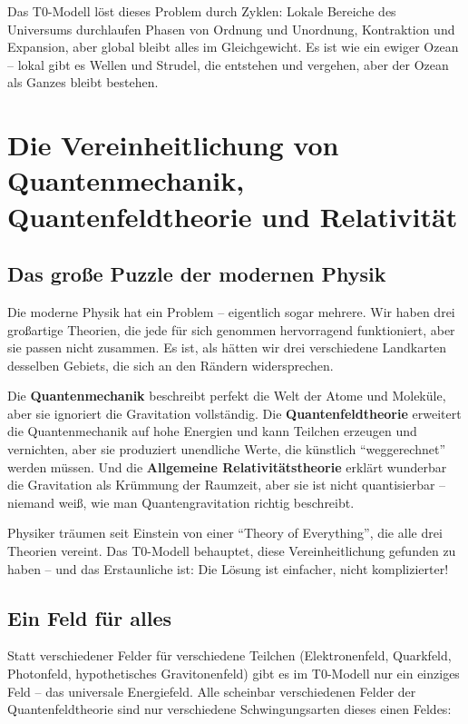 \documentclass[12pt,a4paper]{article}
\begin{document}
	Das T0-Modell löst dieses Problem durch Zyklen: Lokale Bereiche des Universums durchlaufen Phasen von Ordnung und Unordnung, Kontraktion und Expansion, aber global bleibt alles im Gleichgewicht. Es ist wie ein ewiger Ozean -- lokal gibt es Wellen und Strudel, die entstehen und vergehen, aber der Ozean als Ganzes bleibt bestehen.
	
	\section{Die Vereinheitlichung von Quantenmechanik, Quantenfeldtheorie und Relativität}
	
	\subsection{Das große Puzzle der modernen Physik}
	
	Die moderne Physik hat ein Problem -- eigentlich sogar mehrere. Wir haben drei großartige Theorien, die jede für sich genommen hervorragend funktioniert, aber sie passen nicht zusammen. Es ist, als hätten wir drei verschiedene Landkarten desselben Gebiets, die sich an den Rändern widersprechen.
	
	Die \textbf{Quantenmechanik} beschreibt perfekt die Welt der Atome und Moleküle, aber sie ignoriert die Gravitation vollständig. Die \textbf{Quantenfeldtheorie} erweitert die Quantenmechanik auf hohe Energien und kann Teilchen erzeugen und vernichten, aber sie produziert unendliche Werte, die künstlich ``weggerechnet'' werden müssen. Und die \textbf{Allgemeine Relativitätstheorie} erklärt wunderbar die Gravitation als Krümmung der Raumzeit, aber sie ist nicht quantisierbar -- niemand weiß, wie man Quantengravitation richtig beschreibt.
	
	Physiker träumen seit Einstein von einer ``Theory of Everything'', die alle drei Theorien vereint. Das T0-Modell behauptet, diese Vereinheitlichung gefunden zu haben -- und das Erstaunliche ist: Die Lösung ist einfacher, nicht komplizierter!
	
	\subsection{Ein Feld für alles}
	
	Statt verschiedener Felder für verschiedene Teilchen (Elektronenfeld, Quarkfeld, Photonfeld, hypothetisches Gravitonenfeld) gibt es im T0-Modell nur ein einziges Feld -- das universale Energiefeld. Alle scheinbar verschiedenen Felder der Quantenfeldtheorie sind nur verschiedene Schwingungsarten dieses einen Feldes:
	
\end{document}
